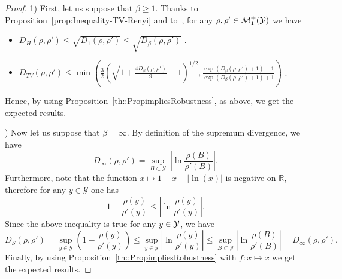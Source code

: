 \begin{proof}
1) First, let us suppose that $\beta \geq 1$. Thanks to Proposition~\ref{prop:Inequality-TV-Renyi} and to~\citep{AGibbsMetrics2002}, for any $\rho, \rho' \in \mathcal{M}^+_1\left( \YY \right)$ we have
\begin{itemize}
\item $D_H(\rho,\rho') \leq \sqrt{ D_{1}(\rho,\rho') } \leq \sqrt{ D_{\beta}(\rho,\rho') } $ \quad {}.
\item $D_{TV}(\rho,\rho') \leq \min \left(\frac{3}{2}\left(\sqrt{1 + \frac{4D_{\beta}(\rho,\rho') }{9}} - 1\right)^{1/2}, \frac{\exp(D_{\beta}(\rho,\rho')  +1) -1}{\exp(D_{\beta}(\rho,\rho')  +1) +1}\right)$ .
\end{itemize}
Hence, by using Proposition~\ref{th::PropimpliesRobustness}, as above, we get the expected results.  

) Now let us suppose that $\beta = \infty$. By definition of the supremum divergence, we have $$
D_{\infty}(\rho,\rho') = \sup_{B \subset \mathcal{Y}} \ \left \vert \ln\frac{\rho(B)}{\rho'(B)}\right \vert.$$
Furthermore, note that the function $x \mapsto  1-x - \left \vert \ln(x)\right \vert $ is negative on $\mathbb{R}$, therefore for any $y \in \mathcal{Y}$ one has $$1-\frac{\rho(y)}{\rho'(y)} \leq \left  \vert \ln\frac{\rho(y)}{\rho'(y)}\right \vert .$$ 
Since the above inequality is true for any $y \in \mathcal{Y}$, we have $$D_S\left(\rho,\rho'\right) = \sup_{y \in \mathcal{Y}}\left(1-\frac{\rho(y)}{\rho'(y)} \right) \leq \sup_{y \in \mathcal{Y}}\left \vert \ln\frac{\rho(y)}{\rho'(y)}\right \vert \leq \sup_{B \subset \mathcal{Y} }\left \vert \ln\frac{\rho(B)}{\rho'(B)}\right \vert = D_{\infty}(\rho,\rho').$$ 
Finally, by using Proposition~\ref{th::PropimpliesRobustness} with $f: x \mapsto x$ we get the expected results.
\end{proof}


